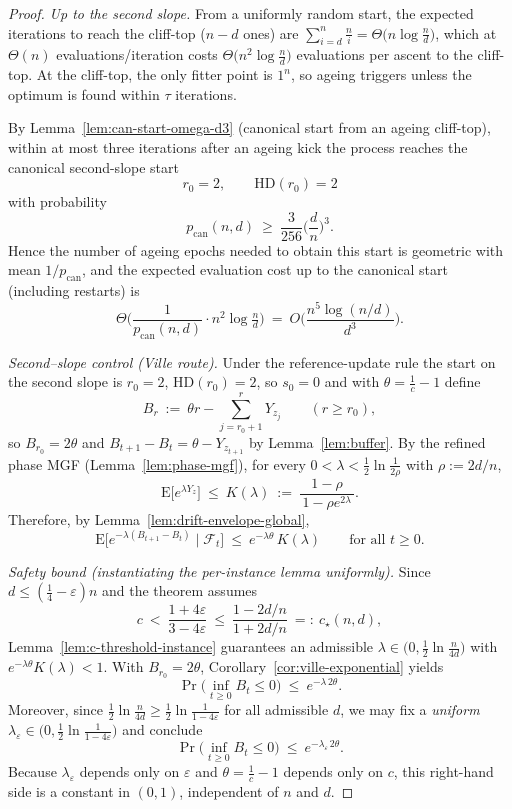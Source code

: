 \documentclass[lettersize,journal]{IEEEtran}
\newcommand{\EE}{\text{E}}
\newcommand{\HD}{\text{HD}}
\begin{document}
\begin{proof}
	\emph{Up to the second slope.}
	From a uniformly random start, the expected iterations to reach the cliff-top ($n-d$ ones) are
	$\sum_{i=d}^{n}\frac{n}{i}=\Theta\!\big(n\log\tfrac{n}{d}\big)$, which at $\Theta(n)$ evaluations/iteration costs
	$\Theta\!\big(n^{2}\log\tfrac{n}{d}\big)$ evaluations per ascent to the cliff-top. At the cliff-top, the only fitter point is $1^n$, so ageing triggers unless the optimum is found within $\tau$ iterations.
	
	By Lemma~\ref{lem:can-start-omega-d3} (canonical start from an ageing cliff-top), within at most three iterations after an ageing kick the process reaches the canonical second-slope start
	\[
	r_0=2,\qquad \HD(r_0)=2
	\]
	with probability
	\[
	p_{\mathrm{can}}(n,d)\ \ge\ \frac{3}{256}\Big(\frac{d}{n}\Big)^{\!3}.
	\]
	Hence the number of ageing epochs needed to obtain this start is geometric with mean $1/p_{\mathrm{can}}$, and the expected evaluation cost up to the canonical start (including restarts) is
	\[
	\Theta\!\Big(\frac{1}{p_{\mathrm{can}}(n,d)}\cdot n^{2}\log\tfrac{n}{d}\Big)
	\ =\ O\!\Big(\frac{n^{5}\log(n/d)}{d^{3}}\Big).
	\]
	
	\smallskip
	\emph{Second–slope control (Ville route).}
	Under the reference-update rule the start on the second slope is $r_0=2$, $\HD(r_0)=2$, so $s_0=0$ and with $\theta=\tfrac1c-1$ define
	\[
	B_r\ :=\ \theta r - \sum_{j=r_0+1}^{r} Y_{z_j}\qquad(r\ge r_0),
	\]
	so $B_{r_0}=2\theta$ and $B_{t+1}-B_t=\theta-Y_{z_{t+1}}$ by Lemma~\ref{lem:buffer}.
	By the refined phase MGF (Lemma~\ref{lem:phase-mgf}), for every $0<\lambda<\tfrac12\ln\!\tfrac{1}{2\rho}$ with $\rho:=2d/n$,
	\[
	\EE\!\big[e^{\lambda Y_z}\big]\ \le\ K(\lambda)\ :=\ \frac{1-\rho}{\,1-\rho e^{2\lambda}\,}.
	\]
	Therefore, by Lemma~\ref{lem:drift-envelope-global},
	\[
	\EE\!\big[e^{-\lambda(B_{t+1}-B_t)}\mid\mathcal F_t\big]\ \le\ e^{-\lambda\theta}\,K(\lambda)\qquad\text{for all }t\ge 0.
	\]
	
	\emph{Safety bound (instantiating the per-instance lemma uniformly).}
	Since $d\le(\tfrac14-\varepsilon)n$ and the theorem assumes
	\[
	c\ <\ \frac{1+4\varepsilon}{3-4\varepsilon}\ \le\ \frac{1-2d/n}{1+2d/n}\ =:\ c_\star(n,d),
	\]
	Lemma~\ref{lem:c-threshold-instance} guarantees an admissible $\lambda\in\big(0,\tfrac12\ln\tfrac{n}{4d}\big)$ with $e^{-\lambda\theta}K(\lambda)<1$.
	With $B_{r_0}=2\theta$, Corollary~\ref{cor:ville-exponential} yields
	\[
	\Pr\!\Big(\inf_{t\ge 0} B_t\le 0\Big)\ \le\ e^{-\lambda\,2\theta}.
	\]
	Moreover, since $\tfrac12\ln\!\tfrac{n}{4d}\ge \tfrac12\ln\!\tfrac{1}{1-4\varepsilon}$ for all admissible $d$, we may fix a \emph{uniform} $\lambda_\varepsilon\in\big(0,\tfrac12\ln\tfrac{1}{1-4\varepsilon}\big)$ and conclude
	\[
	\Pr\!\Big(\inf_{t\ge 0} B_t\le 0\Big)\ \le\ e^{-\lambda_\varepsilon\,2\theta}.
	\]
	Because $\lambda_\varepsilon$ depends only on $\varepsilon$ and $\theta=\tfrac1c-1$ depends only on $c$, this right-hand side is a constant in $(0,1)$, independent of $n$ and $d$.
	

\end{proof}
\end{document}
